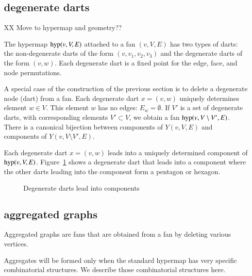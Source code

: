 \subsection{degenerate darts}

 XX Move to hypermap and geometry??

The hypermap ${\operatorname{hyp}}(v,V,E)$ attached to a fan $(v,V,E)$
has two types of darts: the non-degenerate darts of the form
$(v,v_1,v_2,v_3)$ and the degenerate darts of the form $(v,w)$.
Each degenerate dart is a  fixed point for the edge, face, and node
permutations.

A special case of the construction of the previous section
is to delete a degenerate node (dart) from a fan.
Each degenerate dart $x=(v,w)$ uniquely determines element
$w\in V$.  This element $w$ has no edges: $E_w = \emptyset$.
If $V'$ is a set of degenerate darts, with corresponding elements
$V'\subset V$, 
we obtain a fan
${\operatorname{hyp}}(v,V\setminus V',E)$.  There is a canonical bijection
between components of $Y(v,V,E)$ and components of $Y(v,V\setminus V',E)$.

Each degenerate dart $x=(v,w)$ leads into a uniquely determined
component of ${\operatorname{hyp}}(v,V,E)$.  
Figure~\ref{fig:deg-pent-hex} %
shows a degenerate dart that leads into a component where
the other darts leading into the component form a pentagon
or hexagon.

\begin{figure}[htb]
  \centering
  \caption{Degenerate darts lead into components} %
  \label{fig:deg-pent-hex}
\end{figure}


\subsection{aggregated graphs}
\label{sec:stargraph}


Aggregated graphs are fans that are obtained from
a fan by deleting various vertices.  

Aggregates will be formed only when the standard hypermap has
very specific combinatorial structures.  We describe those
combinatorial structures here.




